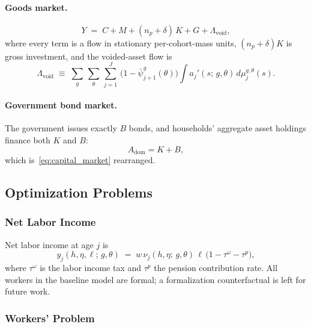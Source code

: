 \documentclass[12pt,a4paper]{article}
\begin{document}
\paragraph{Goods market.}
\begin{equation}
\label{eq:goods_market}
Y \;=\; C + M + (n_p + \delta)\, K + G + \Lambda_{\mathrm{void}},
\end{equation}
where every term is a flow in stationary per-cohort-mass units, $(n_p + \delta) K$ is gross investment, and the voided-asset flow is
\begin{equation}
\label{eq:leakage_voided}
\Lambda_{\mathrm{void}}
\;\equiv\;
\sum_g\, \sum_\theta\, \sum_{j=1}^{J}\, \bigl(1 - \bar\psi_{j+1}^{g}(\theta)\bigr)
\int a_j'(s;\, g, \theta)\, d\mu_{j}^{g,\theta}(s).
\end{equation}
\paragraph{Government bond market.}
The government issues exactly $B$ bonds, and households' aggregate asset holdings finance both $K$ and $B$:
\begin{equation}
A_{\mathrm{dom}} = K + B,
\end{equation}
which is~\eqref{eq:capital_market} rearranged.

\subsection{Optimization Problems}
\label{subsec:optimization}

\subsubsection{Net Labor Income}
\label{subsubsec:net_income}

Net labor income at age $j$ is
\begin{equation}
\label{eq:net_labor_income}
y_j(h, \eta, \ell;\, g, \theta) \;=\; w\, \nu_j(h, \eta;\, g, \theta)\, \ell\, \bigl(1 - \tau^\omega - \tau^p\bigr),
\end{equation}
where $\tau^\omega$ is the labor income tax and $\tau^p$ the pension contribution rate. All workers in the baseline model are formal; a formalization counterfactual is left for future work.

\subsubsection{Workers' Problem}
\label{subsubsec:worker}
\end{document}
